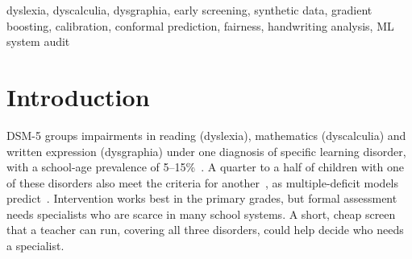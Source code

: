 \documentclass[conference]{IEEEtran}
\begin{document}
\begin{IEEEkeywords}
dyslexia, dyscalculia, dysgraphia, early screening, synthetic data, gradient boosting,
calibration, conformal prediction, fairness, handwriting analysis, ML system audit
\end{IEEEkeywords}

\section{Introduction}
DSM-5 groups impairments in reading (dyslexia), mathematics (dyscalculia) and written
expression (dysgraphia) under one diagnosis of specific learning disorder, with a
school-age prevalence of 5--15\%~\cite{dsm5}. A quarter to a half of children with one
of these disorders also meet the criteria for another~\cite{willcutt2013,landerl2010},
as multiple-deficit models predict~\cite{pennington2006}. Intervention works best in
the primary grades, but formal assessment needs specialists who are scarce in many
school systems. A short, cheap screen that a teacher can run, covering all three
disorders, could help decide who needs a specialist.
\end{document}
